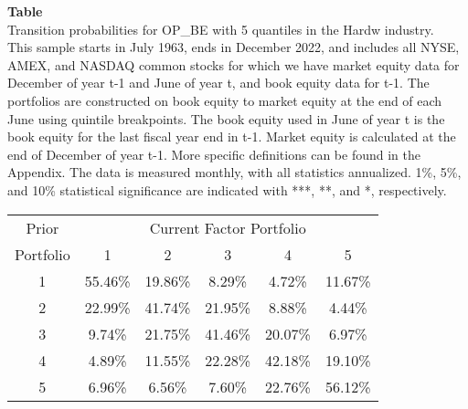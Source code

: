 \begin{table*}[ht!]
\raggedright
{}
\label{tab: transition_probs_OP_BE_Hardw_with_5_quantiles}
\textbf{Table \thetable} \\
Transition probabilities for OP_BE with 5 quantiles in the Hardw industry. \\
\hspace*{1em}This sample starts in July 1963, ends in December 2022, and includes all NYSE, AMEX, and NASDAQ common stocks for which we have market equity data for December of year t-1 and June of year t, and book equity data for t-1. The portfolios are constructed on book equity to market equity at the end of each June using quintile breakpoints.  The book equity used in June of year t is the book equity for the last fiscal year end in t-1.  Market equity is calculated at the end of December of year t-1.  More specific definitions can be found in the Appendix.  The data is measured monthly, with all statistics annualized.  1\%, 5\%, and 10\% statistical significance are indicated with ***, **, and *, respectively. \\
\vspace{0.5em}
\centering
\begin{adjustbox}{max width=\textwidth}
\begin{tabular}{@{}cccccc@{}}
\toprule
Prior & \multicolumn{5}{c}{Current Factor Portfolio} \\
Portfolio & 1 & 2 & 3 & 4 & 5 \\
\midrule
1 & 55.46\% & 19.86\% & 8.29\% & 4.72\% & 11.67\% \\
2 & 22.99\% & 41.74\% & 21.95\% & 8.88\% & 4.44\% \\
3 & 9.74\% & 21.75\% & 41.46\% & 20.07\% & 6.97\% \\
4 & 4.89\% & 11.55\% & 22.28\% & 42.18\% & 19.10\% \\
5 & 6.96\% & 6.56\% & 7.60\% & 22.76\% & 56.12\% \\
\bottomrule
\end{tabular}
\end{adjustbox}
\end{table*}